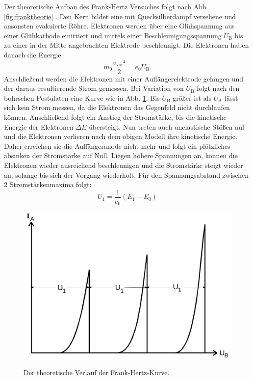 Der theoretische Aufbau des Frank-Hertz Versuches folgt nach Abb.
\ref{fig:franktheorie} . Den Kern bildet eine mit Quecksilberdampf versehene und ansonsten evakuierte
Röhre. Elektronen werden über eine Glühspannung aus einer Glühkathode emittiert
und mittels einer Beschleunigungsspannung $U_\text{B}$ bis zu einer in der Mitte angebrachten
Elektrode beschleunigt. Die Elektronen haben danach die Energie
\begin{equation}
  m_0 \frac{v_\text{vor}²}{2} = e_0 U_\text{B}\text{.}\label{eq:ekin}
  \end{equation}
   Anschließend werden die Elektronen mit einer Auffängerelektrode
gefangen und der daraus resultierende Strom gemessen.
Bei Variation von $U_\text{B}$ folgt nach den bohrschen Postulaten eine
 Kurve wie in Abb. \ref{fig:Graphtheorie}.
 Bis $U_\text{B}$ größer ist als $U_\text{A}$ lässt sich kein Strom messen,
 da die Elektronen das Gegenfeld nicht durchlaufen können.
 Anschließend folgt ein Anstieg der Stromstärke,  bis die kinetische Energie
 der Elektronen $\Delta E$ übersteigt. Nun treten auch unelastische
 Stößen auf und die Elektronen verlieren nach dem obigen Modell ihre kinetische Energie.
  Daher erreichen sie die Auffängeranode nicht mehr und folgt ein plötzliches
  absinken der Stromstärke auf Null. Liegen höhere
 Spannungen an, können die Elektronen wieder ausreichend beschleunigen und die Stromstärke steigt
 wieder an, solange bis sich der Vorgang wiederholt.
 Für den Spannungsabstand zwischen 2 Stromstärkenmaxima folgt:
 \begin{equation}
   U_1 = \frac{1}{e_0}\left( E_1 - E_0 \right)\label{eq:udiff}
   \end{equation}


   \begin{figure}
   	\centering
   	\caption{Der theoretische Verlauf der Frank-Hertz-Kurve.}
   	\includegraphics[width=\linewidth-170pt,height=\textheight-170pt,keepaspectratio]{content/theorie.png}
   	\label{fig:Graphtheorie}
   \end{figure}



